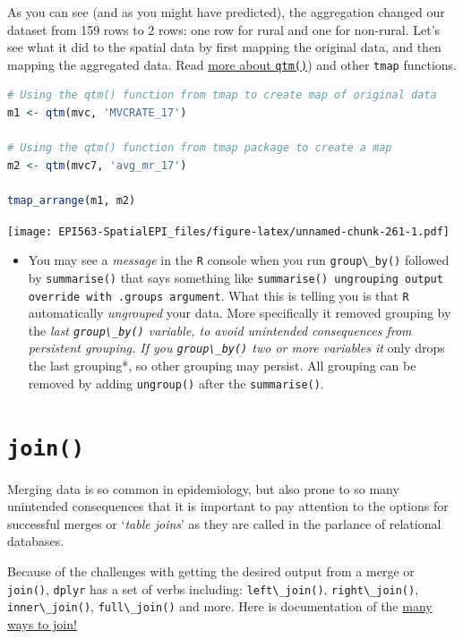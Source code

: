 \documentclass[
]{book}
\newcommand{\passthrough}[1]{#1}
\newenvironment{rmdblock}[1]
  {%
  \begin{itemize}
  \renewcommand{\labelitemi}{
    \raisebox{-.7\height}[0pt][0pt]{
      {\setkeys{Gin}{width=3em,keepaspectratio}\texttt{[image: images/\#1]}}
    }
  }
  \item
  }
  {
  \end{itemize}
  }
\newenvironment{rmdwarning}
  {\begin{rmdblock}{warning}}
  {\end{rmdblock}}
\begin{document}
As you can see (and as you might have predicted), the aggregation changed our dataset from 159 rows to 2 rows: one row for rural and one for non-rural. Let's see what it did to the spatial data by first mapping the original data, and then mapping the aggregated data. Read \protect\hyperlink{qtm}{more about \passthrough{\lstinline!qtm()!}}) and other \passthrough{\lstinline!tmap!} functions.

\begin{lstlisting}[language=R]
# Using the qtm() function from tmap to create map of original data
m1 <- qtm(mvc, 'MVCRATE_17')

# Using the qtm() function from tmap package to create a map
m2 <- qtm(mvc7, 'avg_mr_17')

tmap_arrange(m1, m2)
\end{lstlisting}

\texttt{[image: EPI563-SpatialEPI\_files/figure-latex/unnamed-chunk-261-1.pdf]}

\begin{rmdwarning}
You may see a \emph{message} in the \passthrough{\lstinline!R!} console when you run \passthrough{\lstinline!group\_by()!} followed by \passthrough{\lstinline!summarise()!} that says something like \passthrough{\lstinline!summarise() ungrouping output override with .groups argument!}. What this is telling you is that \passthrough{\lstinline!R!} automatically \emph{ungrouped} your data. More specifically it removed grouping by the \emph{last \passthrough{\lstinline!group\_by()!} variable, to avoid unintended consequences from persistent grouping. If you \passthrough{\lstinline!group\_by()!} two or more variables it }only drops the last grouping*, so other grouping may persist. All grouping can be removed by adding \passthrough{\lstinline!ungroup()!} after the \passthrough{\lstinline!summarise()!}.
\end{rmdwarning}

\hypertarget{join}{%
\section{\texorpdfstring{\texttt{join()}}{join()}}\label{join}}

Merging data is so common in epidemiology, but also prone to so many unintended consequences that it is important to pay attention to the options for successful merges or `\emph{table joins}' as they are called in the parlance of relational databases.

Because of the challenges with getting the desired output from a merge or \passthrough{\lstinline!join()!}, \passthrough{\lstinline!dplyr!} has a set of verbs including: \passthrough{\lstinline!left\_join()!}, \passthrough{\lstinline!right\_join()!}, \passthrough{\lstinline!inner\_join()!}, \passthrough{\lstinline!full\_join()!} and more. Here is documentation of the \href{https://dplyr.tidyverse.org/reference/join.html}{many ways to join!}
\end{document}
